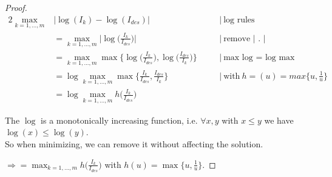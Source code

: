 \begin{proof}
    \begin{alignat*}{2}
        \max_{k=1,...,m}& \big| \log(I_k) - \log(I_{des}) \big|
        \quad&& \Big|\ \text{log rules}\\%
%
        &= \max_{k=1,...,m} \Bigg| \log \bigg( \frac{I_k}{I_{des}} \bigg) \Bigg|
        \quad&& \Big|\ \text{remove | . |}\\%
%
        &= \max_{k=1,...,m} \max \Bigg\{ \log \bigg( \frac{I_k}{I_{des}} \bigg), \log \bigg( \frac{I_{des}}{I_k} \bigg) \Bigg\}
        \quad&& \Big|\ \text{max log = log max}\\%
%
        &= \log \max_{k=1,...,m} \max \Bigg\{  \frac{I_k}{I_{des}} , \frac{I_{des}}{I_k} \Bigg\}
        \quad&& \Big|\ \text{with}\ h=(u) = max \bigg\{u, \frac{1}{u}\bigg\}\\%
%
        &= \log \max_{k=1,...,m} h \bigg( \frac{I_k}{I_{des}} \bigg)
    \end{alignat*}

The $\log$ is a monotonically increasing function, i.e. $\forall x, y$ with $x \le y$ we have $\log(x) \le \log(y)$.\\
So when minimizing, we can remove it without affecting the solution.

$\Rightarrow = \max_{k=1,...,m} h \bigg( \frac{I_k}{I_{des}} \bigg)$ with $h(u) = \max \bigg\{ u, \frac{1}{u} \bigg\}$.
\end{proof}


